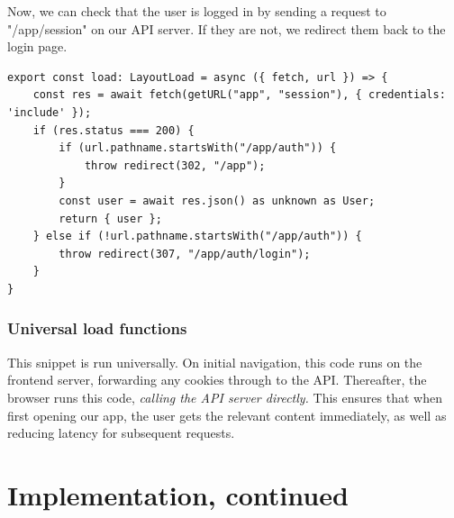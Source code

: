 \documentclass{report}
\begin{document}
Now, we can check that the user is logged in by sending a request to "/app/session" on our API server. If they are not, we redirect them back to the login page.

\begin{verbatim}
export const load: LayoutLoad = async ({ fetch, url }) => {
	const res = await fetch(getURL("app", "session"), { credentials: 'include' });
	if (res.status === 200) {
		if (url.pathname.startsWith("/app/auth")) {
			throw redirect(302, "/app");
		}
		const user = await res.json() as unknown as User;
		return { user };
	} else if (!url.pathname.startsWith("/app/auth")) {
		throw redirect(307, "/app/auth/login");
	}
}
\end{verbatim}

\subsection{Universal load functions}
This snippet is run universally. On initial navigation, this code runs on the frontend server, forwarding any cookies through to the API. Thereafter, the browser runs this code, \emph{calling the API server directly.} This ensures that when first opening our app, the user gets the relevant content immediately, as well as reducing latency for subsequent requests.

\chapter{Implementation, continued}

\printbibliography
\end{document}
